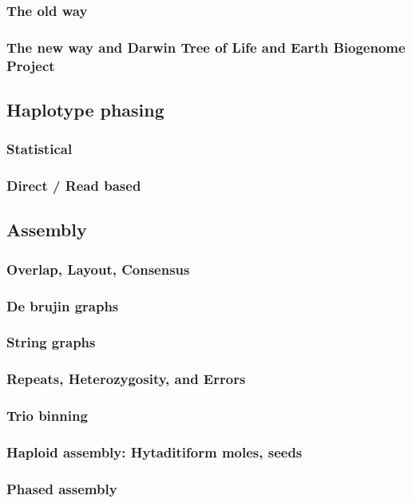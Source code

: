 \subsubsection{The old way}
\subsubsection{The new way and Darwin Tree of Life and Earth Biogenome Project}

\subsection{Haplotype phasing}
\subsubsection{Statistical}
\subsubsection{Direct / Read based}

\subsection{Assembly}
\subsubsection{Overlap, Layout, Consensus}
\subsubsection{De brujin graphs}
\subsubsection{String graphs}
\subsubsection{Repeats, Heterozygosity, and Errors}
\subsubsection{Trio binning}
\subsubsection{Haploid assembly: Hytaditiform moles, seeds}
\subsubsection{Phased assembly}


